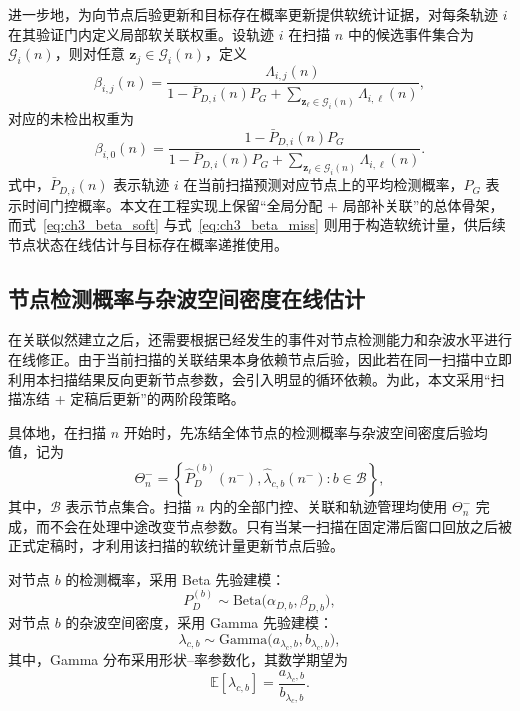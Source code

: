 \documentclass{xdupgthesis}
\begin{document}
进一步地，为向节点后验更新和目标存在概率更新提供软统计证据，对每条轨迹 $i$ 在其验证门内定义局部软关联权重。设轨迹 $i$ 在扫描 $n$ 中的候选事件集合为 $\mathcal G_i(n)$，则对任意 $\mathbf z_j\in\mathcal G_i(n)$，定义
\begin{equation}
	\beta_{i,j}(n)=
	\frac{\Lambda_{i,j}(n)}{1-\bar P_{D,i}(n)P_G+\sum\limits_{\mathbf z_\ell\in\mathcal G_i(n)}\Lambda_{i,\ell}(n)},
	\label{eq:ch3_beta_soft}
\end{equation}
对应的未检出权重为
\begin{equation}
	\beta_{i,0}(n)=
	\frac{1-\bar P_{D,i}(n)P_G}{1-\bar P_{D,i}(n)P_G+\sum\limits_{\mathbf z_\ell\in\mathcal G_i(n)}\Lambda_{i,\ell}(n)}.
	\label{eq:ch3_beta_miss}
\end{equation}
式中，$\bar P_{D,i}(n)$ 表示轨迹 $i$ 在当前扫描预测对应节点上的平均检测概率，$P_G$ 表示时间门控概率。本文在工程实现上保留“全局分配 + 局部补关联”的总体骨架，而式~\eqref{eq:ch3_beta_soft} 与式~\eqref{eq:ch3_beta_miss} 则用于构造软统计量，供后续节点状态在线估计与目标存在概率递推使用。

\subsection{节点检测概率与杂波空间密度在线估计}
\label{subsec:ch3_node_stats}

在关联似然建立之后，还需要根据已经发生的事件对节点检测能力和杂波水平进行在线修正。由于当前扫描的关联结果本身依赖节点后验，因此若在同一扫描中立即利用本扫描结果反向更新节点参数，会引入明显的循环依赖。为此，本文采用“扫描冻结 + 定稿后更新”的两阶段策略。

具体地，在扫描 $n$ 开始时，先冻结全体节点的检测概率与杂波空间密度后验均值，记为
\begin{equation}
	\Theta_n^{-}=
	\left\{
	\hat P_D^{(b)}(n^-),\hat\lambda_{c,b}(n^-):b\in\mathcal B
	\right\},
	\label{eq:ch3_theta_frozen}
\end{equation}
其中，$\mathcal B$ 表示节点集合。扫描 $n$ 内的全部门控、关联和轨迹管理均使用 $\Theta_n^{-}$ 完成，而不会在处理中途改变节点参数。只有当某一扫描在固定滞后窗口回放之后被正式定稿时，才利用该扫描的软统计量更新节点后验。

对节点 $b$ 的检测概率，采用 Beta 先验建模：
\begin{equation}
	P_D^{(b)}\sim \mathrm{Beta}\bigl(\alpha_{D,b},\beta_{D,b}\bigr),
	\label{eq:ch3_beta_prior}
\end{equation}
对节点 $b$ 的杂波空间密度，采用 Gamma 先验建模：
\begin{equation}
	\lambda_{c,b}\sim \mathrm{Gamma}\bigl(a_{\lambda_c,b},b_{\lambda_c,b}\bigr),
	\label{eq:ch3_gamma_prior}
\end{equation}
其中，Gamma 分布采用形状--率参数化，其数学期望为
\begin{equation}
	\mathbb E[\lambda_{c,b}]=\frac{a_{\lambda_c,b}}{b_{\lambda_c,b}}.
	\label{eq:ch3_kappa_mean}
\end{equation}
\end{document}
